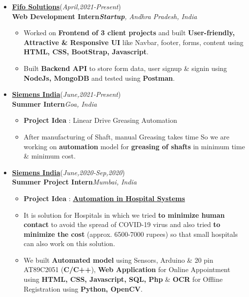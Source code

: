\documentclass[10pt]{extarticle}
\begin{document}
\begin{itemize}
\item \href{https://www.linkedin.com/company/fifo-solutions/}{\textbf{Fifo Solutions}}\hfill\hfill(\textit{April,2021-Present})\\
\textbf{Web Development Intern}\hfill\hfill\textit{\textbf{Startup}, Andhra Pradesh, India}
    \begin{itemize}
        \item Worked on \textbf{Frontend of 3 client projects} and built \textbf{User-friendly, Attractive \& Responsive UI} like Navbar, footer, forms, content using \textbf{HTML, CSS, BootStrap, Javascript}.
        \item Built \textbf{Backend API} to store form data, user signup \& signin using \textbf{NodeJs, MongoDB} and tested using \textbf{Postman}.
    \end{itemize}
\item \href{http://www.siemens.com/}{\textbf{Siemens India}}\hfill\hfill(\textit{June,2021-Present})\\
\textbf{Summer Intern}\hfill\hfill\textit{Goa, India}
     \begin{itemize}
         \item \textbf{Project Idea} : Linear Drive Greasing Automation
         \item After manufacturing of Shaft, manual Greasing takes time So we are working on \textbf{automation} model for \textbf{greasing of shafts} in minimum time \& minimum cost.
     \end{itemize}
\item \href{http://www.siemens.com/}{\textbf{Siemens India}}\hfill\hfill(\textit{June,2020-Sep,2020})\\
\textbf{Summer Project Intern}\hfill\hfill\textit{Mumbai, India}
      \begin{itemize}
          \item \textbf{Project Idea} : \href{https://github.com/PSoni8/Automation-in-Hospital-Systems}{\textbf{Automation in Hospital Systems}}
          \item It is solution for Hospitals in which we tried \textbf{to minimize human contact} to avoid the spread of COVID-19 virus and also tried \textbf{to minimize the cost} (approx. 6500-7000 rupees) so that small hospitals can also work on this solution.
          \item We built \textbf{Automated model} using Sensors, Arduino \& 20 pin AT89C2051 (\textbf{C/C++}), \textbf{Web Application} for Online Appointment using \textbf{ HTML, CSS, Javascript, SQL, Php} \& \textbf{OCR} for Offline Registration using \textbf{Python, OpenCV}.
      \end{itemize}
\end{itemize}
\end{document}
